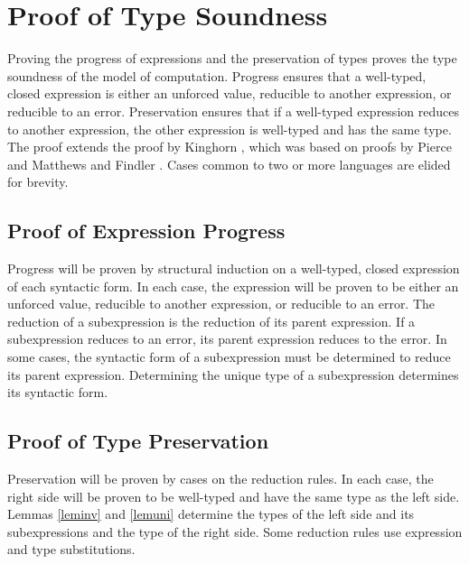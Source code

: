 \chapter{Proof of Type Soundness}


Proving the progress of expressions and the preservation of types proves the type soundness of the model of computation.  Progress ensures that a well-typed, closed expression is either an unforced value, reducible to another expression, or reducible to an error.  Preservation ensures that if a well-typed expression reduces to another expression, the other expression is well-typed and has the same type.  The proof extends the proof by Kinghorn \cite{kinghorn07}, which was based on proofs by Pierce \cite{pierce02} and Matthews and Findler \cite{matthews07}.  Cases common to two or more languages are elided for brevity.

\section{Proof of Expression Progress}

Progress will be proven by structural induction on a well-typed, closed expression of each syntactic form.  In each case, the expression will be proven to be either an unforced value, reducible to another expression, or reducible to an error.  The reduction of a subexpression is the reduction of its parent expression.  If a subexpression reduces to an error, its parent expression reduces to the error.  In some cases, the syntactic form of a subexpression must be determined to reduce its parent expression.  Determining the unique type of a subexpression determines its syntactic form.













\section{Proof of Type Preservation}

Preservation will be proven by cases on the reduction rules.  In each case, the right side will be proven to be well-typed and have the same type as the left side.  Lemmas \ref{leminv} and \ref{lemuni} determine the types of the left side and its subexpressions and the type of the right side.  Some reduction rules use expression and type substitutions.

